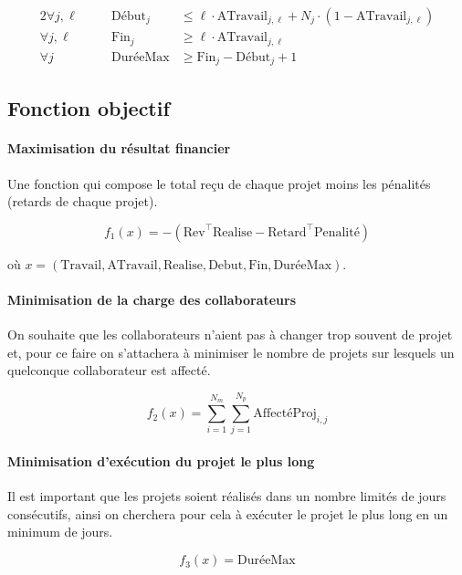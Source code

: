 \documentclass[12pt, a4paper, english, version=last, parskip=half, titlepage]{scrartcl}
\begin{document}
\begin{alignat*}{2}
    \forall j,\ell \quad&& \text{Début}_j  &\le \ell \cdot \text{ATravail}_{j,\ell} + N_j \cdot (1-\text{ATravail}_{j,\ell}) \\
    \forall j,\ell \quad&& \text{Fin}_j    &\ge \ell \cdot \text{ATravail}_{j,\ell} \\
    \forall j      \quad&& \text{DuréeMax} &\ge \text{Fin}_j - \text{Début}_j + 1
\end{alignat*}


\subsection{Fonction objectif}

\paragraph{Maximisation du résultat financier}
Une fonction qui compose le total reçu de chaque projet moins les pénalités (retards de chaque projet).

\begin{equation*}
    f_1(x) = - (\text{Rev}^{\intercal}\text{Realise} - \text{Retard}^{\intercal}\text{Penalité})
\end{equation*}

où $x = (\text{Travail}, \text{ATravail}, \text{Realise}, \text{Debut}, \text{Fin}, \text{DuréeMax})$.

\paragraph{Minimisation de la charge des collaborateurs} On souhaite que les collaborateurs n’aient pas à changer trop souvent de projet et, pour ce faire on s’attachera à minimiser le nombre de projets sur lesquels un quelconque collaborateur est affecté.

\begin{equation*}
    f_2(x) = \sum_{i=1}^{N_m} \sum_{j=1}^{N_p} \text{AffectéProj}_{i,j}
\end{equation*}

\paragraph{Minimisation d'exécution du projet le plus long} Il est important que les projets soient réalisés dans un nombre limités de jours consécutifs, ainsi on cherchera pour cela à exécuter le projet le plus long en un minimum de jours. 

\begin{equation*}
    f_3(x) = \text{DuréeMax}
\end{equation*}
\end{document}
